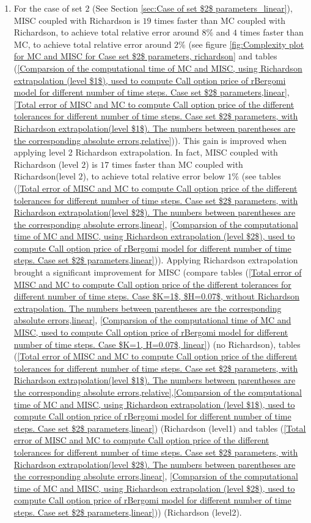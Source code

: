 \documentclass[11pt]{article}
\begin{document}
\begin{itemize}
\begin{enumerate}
		\item For the case of set $2$ (See Section \ref{sec:Case of set $2$ parameters_linear}), MISC coupled with Richardson is $19$ times faster than MC coupled with Richardson, to achieve total relative error around $8\%$ and $4$ times faster than MC, to achieve total relative error around $2\%$ (see figure \ref{fig:Complexity plot for MC and MISC for Case set $2$ parameters, richardson} and tables (\ref{Comparsion of the computational time of  MC and MISC, using Richardson extrapolation (level $1$), used to compute Call option price of rBergomi model for different number of time steps. Case set $2$ parameters,linear}, \ref{Total  error of MISC and MC to compute Call option price of the different tolerances for different number of time steps. Case set $2$ parameters, with Richardson extrapolation(level $1$). The numbers between parentheses are the corresponding absolute errors,relative})). This gain is improved when applying level 2 Richardson extrapolation. In fact,  MISC coupled with Richardson (level $2$) is $17$ times faster than MC coupled with Richardson(level $2$), to achieve total relative error below  $1\%$ (see  tables (\ref{Total  error of MISC and MC to compute Call option price of the different tolerances for different number of time steps. Case set $2$ parameters, with Richardson extrapolation(level $2$). The numbers between parentheses are the corresponding absolute errors,linear}, \ref{Comparsion of the computational time of  MC and MISC, using Richardson extrapolation (level $2$), used to compute Call option price of rBergomi model for different number of time steps. Case set $2$ parameters,linear})). Applying Richardson extrapolation brought a significant improvement for MISC (compare tables (\ref{Total error of MISC and MC to compute Call option price of the different tolerances for different number of time steps. Case $K=1$, $H=0.07$, without Richardson extrapolation. The numbers between parentheses are the corresponding absolute errors,linear}, \ref{Comparsion of the computational time of  MC and MISC, used to compute Call option price of rBergomi model for different number of time steps. Case $K=1, H=0.07$, linear}) (no Richardson), tables (\ref{Total  error of MISC and MC to compute Call option price of the different tolerances for different number of time steps. Case set $2$ parameters, with Richardson extrapolation(level $1$). The numbers between parentheses are the corresponding absolute errors,relative},\ref{Comparsion of the computational time of  MC and MISC, using Richardson extrapolation (level $1$), used to compute Call option price of rBergomi model for different number of time steps. Case set $2$ parameters,linear}) (Richardson (level1) and  tables  (\ref{Total  error of MISC and MC to compute Call option price of the different tolerances for different number of time steps. Case set $2$ parameters, with Richardson extrapolation(level $2$). The numbers between parentheses are the corresponding absolute errors,linear}, \ref{Comparsion of the computational time of  MC and MISC, using Richardson extrapolation (level $2$), used to compute Call option price of rBergomi model for different number of time steps. Case set $2$ parameters,linear})) (Richardson (level2).
		

\end{enumerate}
\end{itemize}
\end{document}
